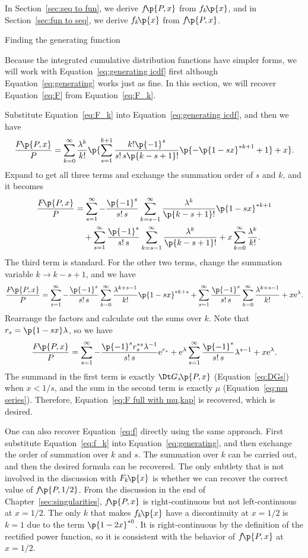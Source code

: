 \documentclass[oneside,12pt,final]{ucthesis-CA2012}
\newcommand{\mrm}[1]{\mathrm{#1}}
\newcommand{\lmd}{\lambda}
\newcommand{\e}{\mrm{e}}
\newcommand{\fr}{\frac}
\newcommand{\fc}[2]{#1\mathchoice{\!}{\!}{}{}\p{#2}} %
\begin{document}
\begin{mainmatter}
In Section~\ref{sec:seq to fun}, we derive $\fc f{P,x}$ from $\fc{f_k}x$,
and in Section~\ref{sec:fun to seq}, we derive $\fc{f_k}x$ from $\fc f{P,x}$.

\begin{section}{Finding the generating function}
\label{sec:seq to fun}

Because the integrated cumulative distribution functions have simpler forms,
we will work with Equation~\ref{eq:generating icdf} first
although Equation~\ref{eq:generating} works just as fine.
In this section, we will recover Equation~\ref{eq:F} from Equation~\ref{eq:F_k}.

Substitute Equation~\ref{eq:F_k} into Equation~\ref{eq:generating icdf}, and then we have
\[\fr{\fc F{P,x}}P
=\sum_{k=0}^\infty\fr{\lmd^k}{k!}\p{\sum_{s=1}^{k+1}\fr{k!\p{-1}^s}{s!\,s\p{k-s+1}!}
\p{-\p{1-sx}^{*k+1}+1}+x}.\]
Expand to get all three terms and exchange the summation order of $s$ and $k$, and it becomes
\begin{align*}
	\fr{\fc F{P,x}}P
	&=\sum_{s=1}^\infty-\fr{\p{-1}^s}{s!\,s}\sum_{k=s-1}^\infty\fr{\lmd^k}{\p{k-s+1}!}\p{1-sx}^{*k+1}\\
	&\phantom{={}}{}+\sum_{s=1}^\infty\fr{\p{-1}^s}{s!\,s}\sum_{k=s-1}^\infty\fr{\lmd^k}{\p{k-s+1}!}
	+x\sum_{k=0}^\infty\fr{\lmd^k}{k!}.
\end{align*}
The third term is standard.
For the other two terms, change the summation variable $k\to k-s+1$, and we have
\[\fr{\fc F{P,x}}P
=\sum_{s=1}^\infty-\fr{\p{-1}^s}{s!\,s}\sum_{k=0}^\infty\fr{\lmd^{k+s-1}}{k!}\p{1-sx}^{*k+s}
+\sum_{s=1}^\infty\fr{\p{-1}^s}{s!\,s}\sum_{k=0}^\infty\fr{\lmd^{k+s-1}}{k!}
+x\e^\lmd.\]
Rearrange the factors and calculate out the sums over $k$.
Note that $r_s=\p{1-sx}\lmd$, so we have
\[\fr{\fc F{P,x}}P
=\sum_{s=1}^\infty-\fr{\p{-1}^sr_s^{*s}\lmd^{-1}}{s!\,s}\e^{r_s}
+\e^\lmd\sum_{s=1}^\infty\fr{\p{-1}^s}{s!\,s}\lmd^{s-1}+x\e^\lmd.\]
The summand in the first term is exactly $\fc{\Dt G_s}{P,x}$ (Equation~\ref{eq:DGs}) when $x<1/s$,
and the sum in the second term is exactly $\mu$ (Equation~\ref{eq:mu series}).
Therefore, Equation~\ref{eq:F full with mu,kap} is recovered, which is desired.

One can also recover Equation~\ref{eq:f} directly using the same approach.
First substitute Equation~\ref{eq:f_k} into Equation~\ref{eq:generating},
and then exchange the order of summation over $k$ and $s$.
The summation over $k$ can be carried out, and then the desired formula can be recovered.
The only subtlety that is not involved in the discussion with $\fc{F_k}x$
is whether we can recover the correct value of $\fc f{P,1/2}$.
From the discussion in the end of Chapter~\ref{sec:singularities},
$\fc f{P,x}$ is right-continuous but not left-continuous at $x=1/2$.
The only $k$ that makes $\fc{f_k}x$ have a discontinuity at $x=1/2$ is $k=1$ due to the term
$\p{1-2x}^{*0}$.
It is right-continuous by the definition of the rectified power function,
so it is consistent with the behavior of $\fc f{P,x}$ at $x=1/2$.


\end{section}
\end{mainmatter}
\end{document}
